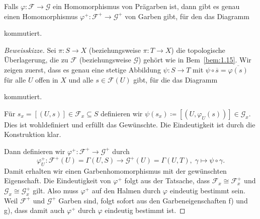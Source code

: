 \begin{prop}
\label{prop:1.17}
	Falls $\varphi \colon \mathcal{F} \to \mathcal{G}$ ein Homomorphismus von Prägarben ist, dann gibt es genau einen Homomorphismus $\varphi^+\colon\mathcal{F}^+\to \mathcal{G}^+$ von Garben gibt, für den das Diagramm
	\begin{center}
	\end{center}
	kommutiert.
	\begin{proof}[Beweisskizze]
		Sei $\pi\colon S \to X$ (beziehungsweise $\pi\colon T \to X$) die topologische Überlagerung, die zu $\mathcal{F}$ (beziehungsweise $\mathcal{G}$) gehört wie in Bem~\ref{bem:1.15}. Wir zeigen zuerst, dass es genau eine stetige Abbildung $\psi \colon S \to T$ mit $\psi \circ \overline{s} = \overline{\varphi(s)}$ für alle $U$ offen in $X$ und alle $s \in \mathcal{F}(U)$ gibt, für die das Diagramm
		\begin{center}
		\end{center}
		kommutiert.

		Für $s_x = [(U,s)] \in \mathcal{F}_x \subseteq S$ definieren wir $\psi(s_x) \coloneqq [(U,\varphi_U(s))] \in \mathcal{G}_x$. Dies ist wohldefiniert und erfüllt das Gewünschte. Die Eindeutigkeit ist durch die Konstruktion klar.

		Dann definieren wir $\varphi^+\colon\mathcal{F}^+\to\mathcal{G}^+$ durch
		\[
			\varphi_U^+\colon \mathcal{F}^+(U) = \Gamma(U,S) \to \mathcal{G}^+(U) = \Gamma(U,T),\; \gamma \mapsto \psi \circ \gamma.
		\]
		Damit erhalten wir einen Garbenhomomorphismus mit der gewünschten Eigenschaft. Die Eindeutigkeit von $\varphi^+$ folgt aus der Tatsache, dass $\mathcal{F}_x \cong \mathcal{F}^+_x$ und $\mathcal{G}_x \cong \mathcal{G}^+_x$ gilt. Also muss $\varphi^+$ auf den Halmen durch $\varphi$ eindeutig bestimmt sein. Weil $\mathcal{F}^+$ und $\mathcal{G}^+$ Garben sind, folgt sofort aus den Garbeneigenschaften f) und g), dass damit auch $\varphi^+$ durch $\varphi$ eindeutig bestimmt ist.
	\end{proof}
\end{prop}


